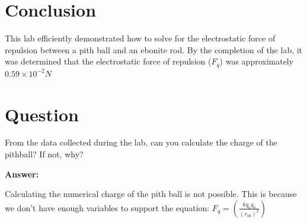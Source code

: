 \documentclass{article}
\begin{document}
\section*{Conclusion}
This lab efficiently demonstrated how to solve for the electrostatic force of repulsion between a pith ball and an ebonite rod.
By the completion of the lab, it was determined that the electrostatic force of repulsion ($F_{q}$) was approximately $0.59 \times 10^{-2} N$

\section*{Question}
From the data collected during the lab, can you calculate the charge of the pithball? If not, why?\newline

\noindent\textbf{Answer:}
\vspace*{0.2cm}
\begin{adjustwidth}{0.5cm}{0pt}
    Calculating the numerical charge of the pith ball is not possible.
    This is because we don't have enough variables to support the equation:
    $F_{q} = \left(\frac{kq_{a}q_{b}}{{(r_{ab})}^{2}}\right)$
\end{adjustwidth}
\end{document}
